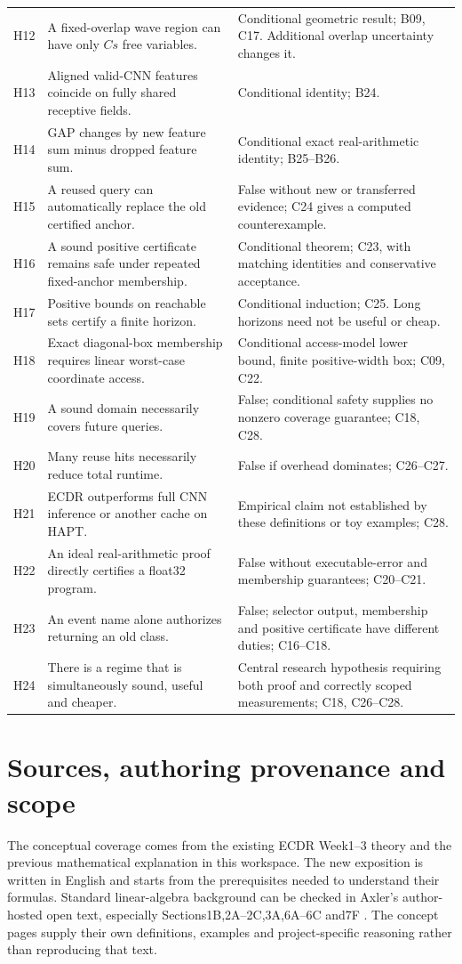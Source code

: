\documentclass[11pt,a4paper]{article}
\newcommand{\conceptid}{Front matter}
\begin{document}
\begin{longtable}{@{}P{0.9cm}P{7.2cm}P{7.1cm}@{}}
H12 & A fixed-overlap wave region can have only $Cs$ free variables. & Conditional geometric result; B09, C17. Additional overlap uncertainty changes it.\\
H13 & Aligned valid-CNN features coincide on fully shared receptive fields. & Conditional identity; B24.\\
H14 & GAP changes by new feature sum minus dropped feature sum. & Conditional exact real-arithmetic identity; B25--B26.\\
H15 & A reused query can automatically replace the old certified anchor. & False without new or transferred evidence; C24 gives a computed counterexample.\\
H16 & A sound positive certificate remains safe under repeated fixed-anchor membership. & Conditional theorem; C23, with matching identities and conservative acceptance.\\
H17 & Positive bounds on reachable sets certify a finite horizon. & Conditional induction; C25. Long horizons need not be useful or cheap.\\
H18 & Exact diagonal-box membership requires linear worst-case coordinate access. & Conditional access-model lower bound, finite positive-width box; C09, C22.\\
H19 & A sound domain necessarily covers future queries. & False; conditional safety supplies no nonzero coverage guarantee; C18, C28.\\
H20 & Many reuse hits necessarily reduce total runtime. & False if overhead dominates; C26--C27.\\
H21 & ECDR outperforms full CNN inference or another cache on HAPT. & Empirical claim not established by these definitions or toy examples; C28.\\
H22 & An ideal real-arithmetic proof directly certifies a float32 program. & False without executable-error and membership guarantees; C20--C21.\\
H23 & An event name alone authorizes returning an old class. & False; selector output, membership and positive certificate have different duties; C16--C18.\\
H24 & There is a regime that is simultaneously sound, useful and cheaper. & Central research hypothesis requiring both proof and correctly scoped measurements; C18, C26--C28.\\\bottomrule
\end{longtable}
\normalsize

\clearpage
\renewcommand{\conceptid}{Sources and evidence}
\section{Sources, authoring provenance and scope}
The conceptual coverage comes from the existing ECDR Week1--3 theory and
the previous mathematical explanation in this workspace. The new exposition
is written in English and starts from the prerequisites needed to understand
their formulas. Standard linear-algebra background can be checked in
Axler's author-hosted open text, especially Sections1B,2A--2C,3A,6A--6C
and7F \cite{axler}. The concept pages supply their own definitions,
examples and project-specific reasoning rather than reproducing that text.
\end{document}
